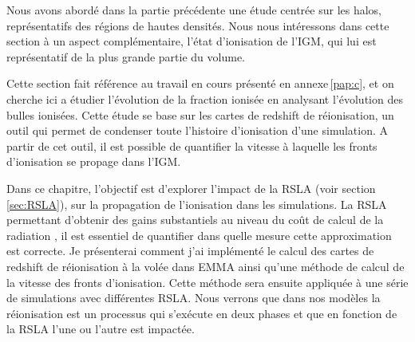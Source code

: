 Nous avons abordé dans la partie précédente une étude centrée sur les halos, représentatifs des régions de hautes densités. %
Nous nous intéressons dans cette section à un aspect complémentaire, l'état d'ionisation de l'\ac{IGM}, qui lui est représentatif de la plus grande partie du volume.

Cette section fait référence au travail en cours présenté en annexe\,\ref{pap:c}, et on cherche ici a étudier l’évolution de la fraction ionisée en analysant l'évolution des bulles ionisées.
Cette étude se base sur les cartes de redshift de réionisation, un outil qui permet de condenser toute l'histoire d'ionisation d'une simulation.
A partir de cet outil, il est possible de quantifier la vitesse à laquelle les fronts d'ionisation se propage dans l'\ac{IGM}.

Dans ce chapitre, l'objectif est d'explorer l'impact de la \ac{RSLA} (voir section \ref{sec:RSLA}), sur la propagation de l'ionisation dans les simulations.
La \ac{RSLA} permettant d'obtenir des gains substantiels au niveau du coût de calcul de la radiation \citep{rosdahl_ramsesrt_2013, aubert_radiative_2008, 2001NewA....6..437G}, il est essentiel de quantifier dans quelle mesure cette approximation est correcte.
Je présenterai comment j'ai implémenté le calcul des cartes de redshift de réionisation à la volée dans EMMA ainsi qu'une méthode de calcul de la vitesse des fronts d'ionisation.
Cette méthode sera ensuite appliquée à une série de simulations avec différentes \ac{RSLA}.
Nous verrons que dans nos modèles la réionisation est un processus qui s’exécute en deux phases et que en fonction de la \ac{RSLA} l'une ou l'autre est impactée.


%


